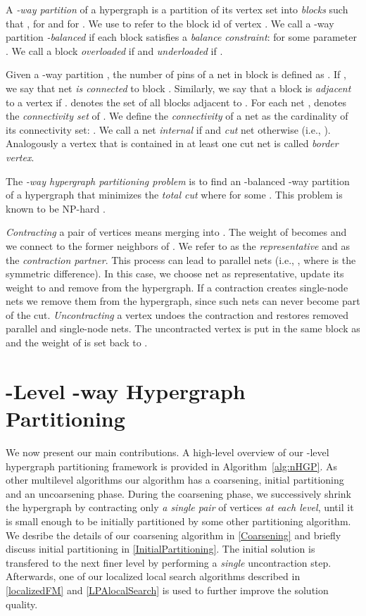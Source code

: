 \documentclass[runningheads,a4paper]{llncs}
\begin{document}
A \emph{-way partition} of a hypergraph  is a partition of its vertex set into  \emph{blocks}  
such that ,  for  and  for . We use  to refer to the block id of vertex .
We call a -way partition  \emph{-balanced} if each block  satisfies a \emph{balance constraint}:
 for some parameter . 
We call a block  \emph{overloaded} if  and \emph{underloaded} if .

Given a -way partition , the number of pins of a net  in block  is defined as 
. If , we say that net  \emph{is connected} to block . Similarly, we say that a block  is \emph{adjacent} to a vertex  if .  denotes the set of all blocks adjacent to .
For each net ,  denotes the \emph{connectivity set} of . We define the \emph{connectivity} of a net  as the cardinality of its connectivity set:  \cite{PaToH}.
We call a net  \emph{internal} if  and \emph{cut} net otherwise (i.e., ). Analogously a vertex that is contained in at least one cut net is called \emph{border vertex}. 


The \emph{-way hypergraph partitioning problem} is to find an -balanced -way partition of a hypergraph  that minimizes the \emph{total cut}  where  for some . This problem is known to be NP-hard \cite{Lengauer:1990}.

\emph{Contracting} a pair of vertices  means merging  into . The weight of  becomes  and we 
connect  to the former neighbors  of . We refer to  as the \emph{representative} and  as the \emph{contraction partner}. 
This process can lead to parallel nets (i.e., , where  is the 
symmetric difference). In this case, we choose net  as representative, update its weight to  
and remove  from the hypergraph. If a contraction creates single-node nets we remove them from the hypergraph, since such nets 
can never become part of the cut. \emph{Uncontracting} a vertex  undoes the contraction and restores removed parallel and single-node nets. The uncontracted vertex  is put in the same 
block as  and the weight of  is set back to .
\vfill

\section{-Level -way Hypergraph Partitioning}  \label{nHGP}
We now present our main contributions. A high-level overview of our -level hypergraph partitioning framework is provided in Algorithm~\ref{alg:nHGP}. As other multilevel algorithms our algorithm has  a coarsening, initial partitioning and an uncoarsening phase.
During the coarsening phase, we successively shrink the hypergraph by contracting only \emph{a single pair} of vertices \emph{at each level},
until it is small enough to be initially partitioned by some other partitioning algorithm. We desribe the details of our coarsening
algorithm in \autoref{Coarsening} and briefly discuss initial partitioning in \autoref{InitialPartitioning}. The initial solution is transfered
to the next finer level by performing a \emph{single} uncontraction step. Afterwards, one of our localized local search algorithms described in
\autoref{localizedFM} and \autoref{LPAlocalSearch} is used to further improve the solution quality.
\end{document}
